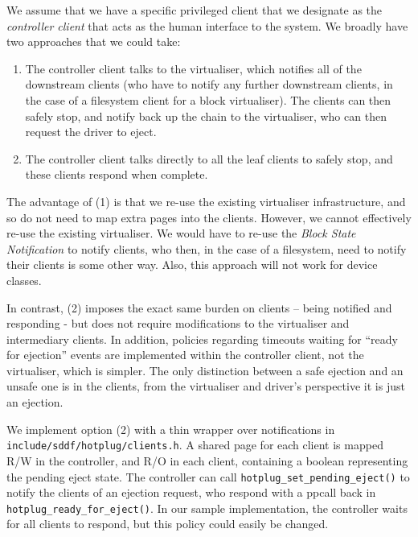 \documentclass[a4paper,12pt]{report}
\begin{document}
We assume that we have a specific privileged client that we designate as
the \emph{controller client} that acts as the human interface to the system.
We broadly have two approaches that we could take:

\begin{enumerate}
\item The controller client talks to the virtualiser, which notifies all of
      the downstream clients (who have to notify any further downstream
      clients, in the case of a filesystem client for a block virtualiser).
      The clients can then safely stop, and notify back up the chain to the
      virtualiser, who can then request the driver to eject.

\item The controller client talks directly to all the leaf clients to safely
      stop, and these clients respond when complete.
\end{enumerate}

The advantage of (1) is that we re-use the existing virtualiser
infrastructure, and so do not need to map extra pages into the clients.
However, we cannot effectively re-use the existing virtualiser. We would
have to re-use the \emph{Block State Notification} to notify clients,
who then, in the case of a filesystem, need to notify their clients is
some other way. Also, this approach will not work for  device classes.

In contrast, (2) imposes the exact same burden on clients -- being
notified and responding - but does not require modifications to the
virtualiser and intermediary clients. In addition, policies regarding
timeouts waiting for ``ready for ejection'' events are implemented within the
controller client, not the virtualiser, which is simpler. The only
distinction between a safe ejection and an unsafe one is in the
clients, from the virtualiser and driver's perspective it is just an
ejection.

We implement option (2) with a thin wrapper over notifications in
\texttt{include/sddf/hotplug/clients.h}. A shared page for each client
is mapped R/W in the controller, and R/O in each client, containing a
boolean representing the pending eject state. The controller can call
\texttt{hotplug\_set\_pending\_eject()} to notify the clients of an
ejection request, who respond with a ppcall back in
\texttt{hotplug\_ready\_for\_eject()}. In our sample implementation, the
controller waits for all clients to respond, but this policy could
easily be changed.
\end{document}
